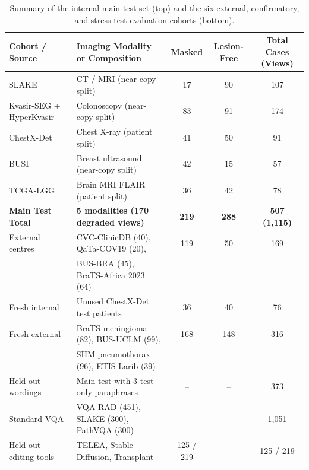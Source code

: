 \documentclass{article} %
\begin{document}
\begin{table}[t]
\caption{Summary of the internal main test set (top) and the six external, confirmatory, and stress-test evaluation cohorts (bottom).}
\label{tab:datasets_overview}
\vspace{-0.2cm}
\begin{center}
\small
\begin{tabular}{llccc}
\toprule
\textbf{Cohort / Source} & \textbf{Imaging Modality or Composition} & \textbf{Masked} & \textbf{Lesion-Free} & \textbf{Total Cases (Views)} \\
\midrule
SLAKE & CT / MRI (near-copy split) & 17 & 90 & 107 \\
Kvasir-SEG + HyperKvasir & Colonoscopy (near-copy split) & 83 & 91 & 174 \\
ChestX-Det & Chest X-ray (patient split) & 41 & 50 & 91 \\
BUSI & Breast ultrasound (near-copy split) & 42 & 15 & 57 \\
TCGA-LGG & Brain MRI FLAIR (patient split) & 36 & 42 & 78 \\
\textbf{Main Test Total} & \textbf{5 modalities (170 degraded views)} & \textbf{219} & \textbf{288} & \textbf{507 (1,115)} \\
\midrule
External centres & CVC-ClinicDB (40), QaTa-COV19 (20), & 119 & 50 & 169 \\
 & BUS-BRA (45), BraTS-Africa 2023 (64) & & & \\
Fresh internal & Unused ChestX-Det test patients & 36 & 40 & 76 \\
Fresh external & BraTS meningioma (82), BUS-UCLM (99), & 168 & 148 & 316 \\
 & SIIM pneumothorax (96), ETIS-Larib (39) & & & \\
Held-out wordings & Main test with 3 test-only paraphrases & -- & -- & 373 \\
Standard VQA & VQA-RAD (451), SLAKE (300), PathVQA (300) & -- & -- & 1,051 \\
Held-out editing tools & TELEA, Stable Diffusion, Transplant & 125 / 219 & -- & 125 / 219 \\
\bottomrule
\end{tabular}
\end{center}
\vspace{-0.2cm}
\end{table}
\end{document}
